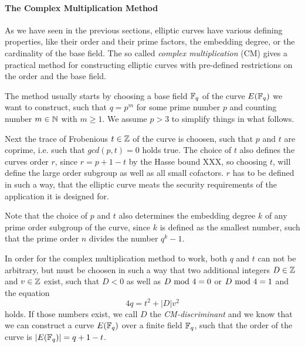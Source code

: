 \paragraph{The Complex Multiplication Method}
As we have seen in the previous sections, elliptic curves have various defining properties, like their order and their prime factors, the embedding degree, or the cardinality of the base field. The so called \textit{complex multiplication} (CM) gives a practical method for constructing elliptic curves with pre-defined restrictions on the order and the base field.


The method usually starts by choosing a base field $\mathbb{F}_{q}$ of the curve $E(\mathbb{F}_q)$ we want to construct, such that $q = p^m$ for some prime number $p$ and counting number $m\in \mathbb{N}$ with $m\geq 1$. We assume $p>3$ to simplify things in what follows. 

Next the trace of Frobenious $t\in \mathbb{Z}$ of the curve is choosen, such that $p$ and $t$ are coprime, i.e. such that $gcd(p,t)=0$ holds true. The choice of $t$ also defines the curves order $r$, since $r=p+1-t$ by the Hasse bound XXX, so choosing $t$, will define the large order subgroup as well as all small cofactors. $r$ has to be defined in such a way, that the elliptic curve meats the security requirements of the application it is designed for. 

Note that the choice of $p$ and $t$ also determines the embedding degree $k$ of any prime order subgroup of the curve, since $k$ is defined as the smallest number, such that the prime order $n$ divides the number $q^k-1$.

In order for the complex multiplication method to work, both $q$ and $t$ can not be arbitrary, but must be choosen in such a way that two additional integers $D\in \mathbb{Z}$ and $v\in \mathbb{Z}$ exist, such that $D<0$ as well as $D \text{ mod } 4=0$ or $D \text{ mod } 4=1$ and the equation
\begin{equation}
     4q  = t^2 + |D|v^2 
\end{equation}
holds. If those numbers exist, we call $D$ the \textit{CM-discriminant} and we know that we can construct a curve $E(\mathbb{F}_q)$ over a finite field $\mathbb{F}_q$, such that the order of the curve is $|E(\mathbb{F}_q)|= q+1-t$. 

